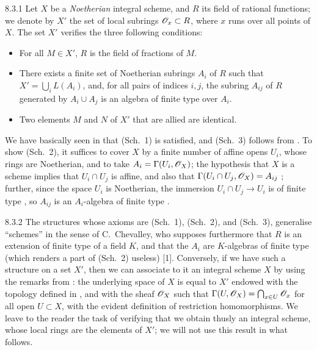 \documentclass{book}
\begin{document}
\begin{env}{8.3.1}
\label{env-1.8.3.1}
Let $X$ be a \emph{Noetherian} integral scheme, and $R$ its
field of rational functions; we denote by $X'$ the set of local subrings
$\mathscr{O}_x\subset R$, where $x$ runs over all points of $X$. The set $X'$ verifies
the three following conditions:
\begin{itemize}
  \item[(Sch. 1)] For all $M\in X'$, $R$ is the field of fractions of $M$.
  \item[(Sch. 2)] There exists a finite set of Noetherian subrings $A_i$ of $R$
  such that $X'=\bigcup_i L(A_i)$, and, for all pairs of indices $i,j$, the subring
  $A_{ij}$ of $R$ generated by $A_i\cup A_j$ is an algebra of finite type over $A_i$.
  \item[(Sch. 3)] Two elements $M$ and $N$ of $X'$ that are allied are identical.
\end{itemize}
\end{env}

We have basically seen in  that (Sch.~1) is satisfied, and (Sch.~3)
follows from . To show (Sch.~2), it suffices to cover $X$ by a
finite number of affine opens $U_i$, whose rings are Noetherian, and to take
$A_i=\Gamma(U_i,\mathscr{O}_X)$; the hypothesis that $X$ is a scheme implies that
$U_i\cap U_j$ is affine, and also that $\Gamma(U_i\cap U_j,\mathscr{O}_X)=A_{ij}$
; further, since the space $U_i$ is Noetherian, the immersion
$U_i\cap U_j\to U_i$ is of finite type , so $A_{ij}$ is an
$A_i$-algebra of finite type .

\begin{env}{8.3.2}
\label{env-1.8.3.2}
The structures whose axioms are (Sch.~1), (Sch.~2), and
(Sch.~3), generalise ``schemes'' in the sense of C.~Chevalley, who supposes
furthermore that $R$ is an extension of finite type of a field $K$, and that the
$A_i$ are $K$-algebras of finite type (which renders a part of (Sch.~2) useless)
[1]. Conversely, if we have such a structure on a set $X'$, then we can
associate to it an integral scheme $X$ by using the remarks from :
the underlying space of $X$ is equal to $X'$ endowed with the topology defined
in , and with the sheaf $\mathscr{O}_X$ such that
$\Gamma(U,\mathscr{O}_X)=\bigcap_{x\in U}\mathscr{O}_x$ for all open $U\subset X$, with the
evident definition of restriction homomorphisms. We leave to the reader the
task of verifying that we obtain thusly an integral scheme, whose local rings
are the elements of $X'$; we will not use this result in what follows.
\end{env}
\end{document}
